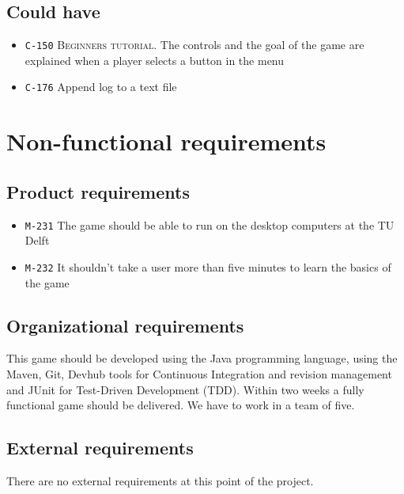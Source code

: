 \documentclass[a4paper]{article}
\begin{document}
\subsection{Could have}

\begin{itemize}
	\item \texttt{C-150} \textsc{Beginners tutorial.} The controls and the goal of the game are explained when a player selects a button in the menu
      \item \texttt{C-176} Append log to a text file
\end{itemize}


\section{Non-functional requirements}
\subsection{Product requirements}

\begin{itemize}
  \item \texttt{M-231} The game should be able to run on the desktop computers at the TU Delft
  \item \texttt{M-232} It shouldn't take a user more than five minutes to learn the basics of the game
\end{itemize}


\subsection{Organizational requirements}
This game should be developed using the Java programming language, using the Maven, Git, Devhub tools for Continuous Integration and revision management and JUnit for Test-Driven Development (TDD). Within two weeks a fully functional game should be delivered. We have to work in a team of five.

\subsection{External requirements}
There are no external requirements at this point of the project.





\pagebreak
\end{document}
